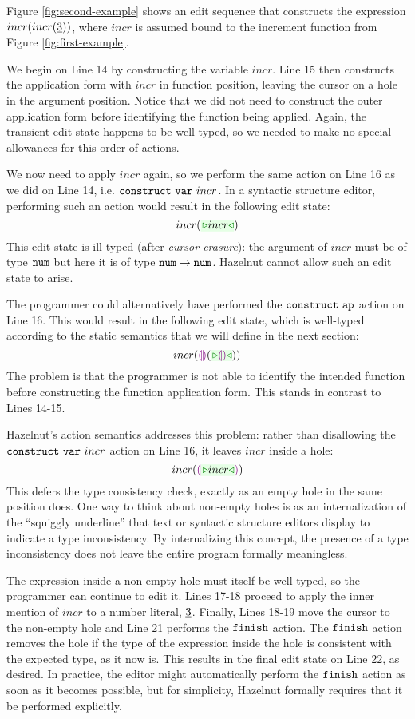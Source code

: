 Figure \ref{fig:second-example} shows an edit sequence that constructs the
expression $incr(incr(\underline{3}))$, where $incr$ is assumed bound to the
increment function from Figure \ref{fig:first-example}.

We begin on Line 14 by constructing the variable $incr$. Line 15 then
constructs the application form with $incr$ in function position, leaving
the cursor on a hole in the argument position. Notice that we did not need
to construct the outer application form before identifying the function
being applied. Again, the transient edit state happens to be well-typed, so
we needed to make no special allowances for this order of actions.

We now need to apply $incr$ again, so we perform the same action on Line 16
as we did on Line 14, i.e. $\mathtt{construct}~\mathtt{var}~incr$. In a syntactic
structure editor, performing such an action would result in the following
edit state:
\[
incr(\zwsel{incr})
\]
This edit state is ill-typed (after \emph{cursor erasure}): the argument of
$incr$ must be of type $\texttt{num}$ but here it is of type
$\texttt{num} \rightarrow \texttt{num}$. Hazelnut cannot allow such an edit state to arise.

The programmer could alternatively have performed the $\mathtt{construct}~\mathtt{ap}$
action on Line 16. This would result in the following edit state, which is
well-typed according to the static semantics that we will define in the
next section:
\[
incr(\hhole{}(\zwsel{\hhole{}}))
\]
The problem is that the programmer is not able to identify the intended
function before constructing the function application form. This stands in
contrast to Lines 14-15.

Hazelnut's action semantics addresses this problem: rather than disallowing
the $\mathtt{construct}~\mathtt{var}~incr$ action on Line 16, it leaves $incr$ inside a
hole:
\[
incr(\hhole{\zwsel{incr}})
\]
This defers the type consistency check, exactly as an empty hole in the
same position does. One way to think about non-empty holes is as an
internalization of the ``squiggly underline'' that text or syntactic
structure editors display to indicate a type inconsistency. By
internalizing this concept, the presence of a type inconsistency does not
leave the entire program formally meaningless.

The expression inside a non-empty hole must itself be well-typed, so the
programmer can continue to edit it. Lines 17-18 proceed to apply the inner
mention of $incr$ to a number literal, $\underline{3}$. Finally, Lines 18-19
move the cursor to the non-empty hole and Line 21 performs the $\mathtt{finish}$
action. The $\mathtt{finish}$ action removes the hole if the type of the
expression inside the hole is consistent with the expected type, as it now
is. This results in the final edit state on Line 22, as desired. In
practice, the editor might automatically perform the $\mathtt{finish}$ action as
soon as it becomes possible, but for simplicity, Hazelnut formally requires
that it be performed explicitly.
